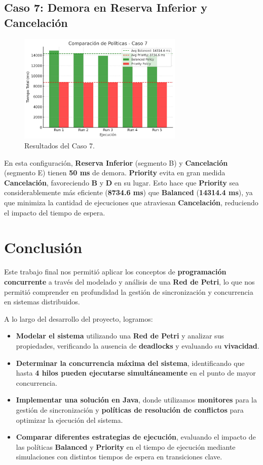 \documentclass[12pt]{article}
\begin{document}
\subsection{Caso 7: Demora en Reserva Inferior y Cancelación}

\begin{figure}[H]
    \centering
    \includegraphics[width=0.7\textwidth]{CASO_7.jpeg}
    \caption{Resultados del Caso 7.}
\end{figure}

En esta configuración, \textbf{Reserva Inferior} (segmento B) y \textbf{Cancelación} (segmento E) tienen \textbf{50 ms} de demora. \textbf{Priority} evita en gran medida \textbf{Cancelación}, favoreciendo \textbf{B} y \textbf{D} en su lugar. Esto hace que \textbf{Priority} sea considerablemente más eficiente (\textbf{8734.6 ms}) que \textbf{Balanced} (\textbf{14314.4 ms}), ya que minimiza la cantidad de ejecuciones que atraviesan \textbf{Cancelación}, reduciendo el impacto del tiempo de espera.
\newpage
\section{Conclusión}

Este trabajo final nos permitió aplicar los conceptos de \textbf{programación concurrente} a través del modelado y análisis de una \textbf{Red de Petri}, lo que nos permitió comprender en profundidad la gestión de sincronización y concurrencia en sistemas distribuidos.

A lo largo del desarrollo del proyecto, logramos:
\begin{itemize}
    \item \textbf{Modelar el sistema} utilizando una \textbf{Red de Petri} y analizar sus propiedades, verificando la ausencia de \textbf{deadlocks} y evaluando su \textbf{vivacidad}.
    \item \textbf{Determinar la concurrencia máxima del sistema}, identificando que hasta \textbf{4 hilos pueden ejecutarse simultáneamente} en el punto de mayor concurrencia.
    \item \textbf{Implementar una solución en Java}, donde utilizamos \textbf{monitores} para la gestión de sincronización y \textbf{políticas de resolución de conflictos} para optimizar la ejecución del sistema.
    \item \textbf{Comparar diferentes estrategias de ejecución}, evaluando el impacto de las políticas \textbf{Balanced} y \textbf{Priority} en el tiempo de ejecución mediante simulaciones con distintos tiempos de espera en transiciones clave.
\end{itemize}
\end{document}
